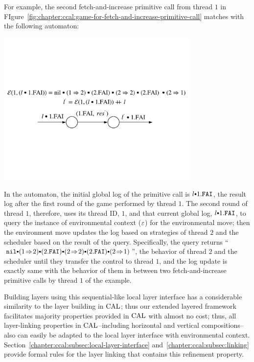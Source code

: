 For example, the second fetch-and-increase primitive call from thread $1$ in FIgure~\ref{fig:chapter:ccal:game-for-fetch-and-increase-primitive-call}
matches with the following automaton:
\begin{center}
\includegraphics[width=0.75\textwidth]{figs/ccal/faiexamplewithcontext}
\end{center}
In the automaton, the initial global log of the primitive call is $l \cons 1.\incticket$,
the result log after the first round of the game performed by thread $1$.
The second round of thread $1$, therefore, uses its thread ID, $1$,  and that current global log, $l \cons 1.\incticket$, to query the instance of environmental context (${\varepsilon}$) for the environmental move; then the environment move updates the log based on strategies of thread $2$ and the scheduler based on the result of the query.
Specifically, the query returns ``$\nulllist \cons (1 \switch 2) \cons (2.\incticket) \cons (2 \switch 2) \cons (2.\incticket) \cons (2 \switch 1)$'',
the behavior of thread $2$ and the scheduler until they transfer the control to thread $1$,  and 
the log update is exactly same with the behavior of them in between two fetch-and-increase primitive calls by thread $1$ of the example.

Building layers using this sequential-like local layer interface has a considerable similarity to 
the layer building in $\mathrm{CAL}$; thus 
our extended layered framework facilitates
majority properties provided in $\mathrm{CAL}$ with almost no cost;
thus, all layer-linking properties in $\mathrm{CAL}$--including horizontal and vertical compositions--also can 
easily be adapted to the local layer interface with environmental context.
Section~\ref{chapter:ccal:subsec:local-layer-interface}  and~\ref{chapter:ccal:subsec:linking} provide formal rules for the layer linking that contains this refinement property.

